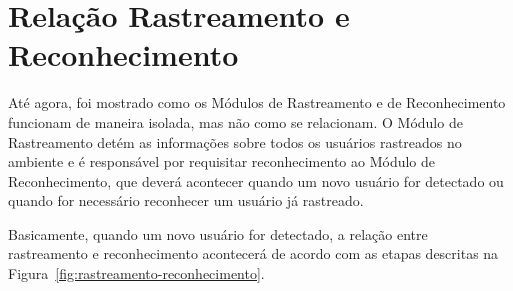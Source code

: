 \section{Relação Rastreamento e Reconhecimento}
\label{sec:rastreamento-reconhecimento}

	Até agora, foi mostrado como os Módulos de Rastreamento e de Reconhecimento funcionam de maneira isolada, mas não como se relacionam. O Módulo de Rastreamento detém as informações sobre todos os usuários rastreados no ambiente e é responsável por requisitar reconhecimento ao Módulo de Reconhecimento, que deverá acontecer quando um novo usuário for detectado ou quando for necessário reconhecer um usuário já rastreado.

	Basicamente, quando um novo usuário for detectado, a relação entre rastreamento e reconhecimento acontecerá de acordo com as etapas descritas na Figura~\ref{fig:rastreamento-reconhecimento}.

